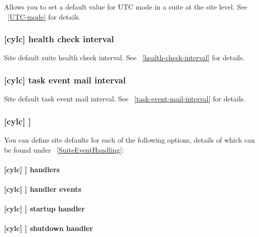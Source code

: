 Allows you to set a default value for UTC mode in a suite at the site level.
See ~\ref{UTC-mode} for details.

\subsubsection[health check interval]{[cylc] \textrightarrow health check interval}

Site default suite health check interval.
See ~\ref{health-check-interval} for details.

\subsubsection[task event mail interval]{[cylc] \textrightarrow task event mail interval}

Site default task event mail interval.
See ~\ref{task-event-mail-interval} for details.

\subsubsection[{[}events{]}]{[cylc] \textrightarrow [[events]]}
\label{SiteCylcHooks}

You can define site defaults for each of the following options, details
of which can be found under ~\ref{SuiteEventHandling}:

\paragraph[handlers]{[cylc] \textrightarrow [[events]] \textrightarrow handlers}

\paragraph[handler events]{[cylc] \textrightarrow [[events]] \textrightarrow handler events}

\paragraph[startup handler]{[cylc] \textrightarrow [[events]] \textrightarrow startup handler}

\paragraph[shutdown handler]{[cylc] \textrightarrow [[events]] \textrightarrow shutdown handler}

